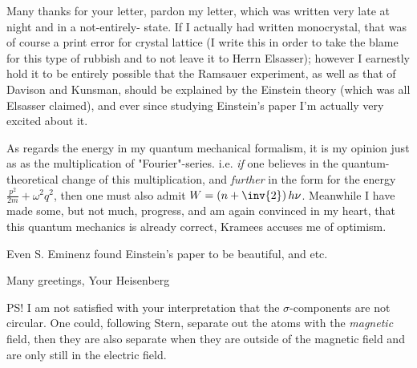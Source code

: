 \date{June 29, 1925}

Many thanks for your letter, pardon my letter, which was written very late at night and in a not-entirely- state. If I actually had written monocrystal, that was of course a print error for crystal lattice (I write this in order to take the blame for this type of rubbish and to not leave it to Herrn Elsasser); however I earnestly hold it to be entirely possible that the Ramsauer experiment, as well as that of Davison and Kunsman, should be explained by the Einstein theory (which was all Elsasser claimed), and ever since studying Einstein's paper I'm actually very excited about it.

As regards the energy  in my quantum mechanical formalism, it is my opinion just as  as the multiplication of "Fourier"-series. i.e. \textit{if} one believes in the quantum-theoretical change of this multiplication, and \textit{further} in the form for the energy $\frac{p^2}{2m} + \omega^2 q^2$, then one must also admit $W=\left(n+\inv{2}\right)h\nu$. Meanwhile I have made some, but not much, progress, and am again convinced in my heart, that this quantum mechanics is already correct,  Kramees accuses me of optimism.

Even S. Eminenz found Einstein's paper to be beautiful, and  etc.

Many greetings,
Your Heisenberg

PS! I am not satisfied with your interpretation that the $\sigma$-components are not circular. One could, following Stern, separate out the atoms with the \textit{magnetic} field, then they are also separate when they are outside of the magnetic field and are only still in the electric field.